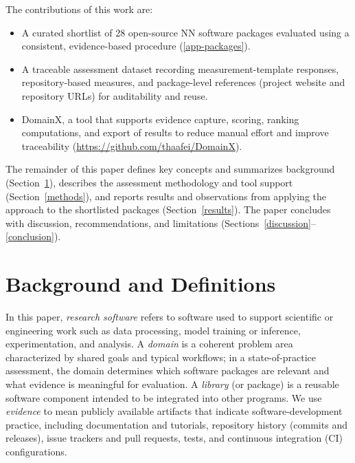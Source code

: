 \documentclass[final,1p,times,authoryear,12pt]{elsarticle}
\providecommand{\wss}[1]{\textcolor{blue}{\textit{#1}}}
\begin{document}
The contributions of this work are:
\begin{itemize}
  \item A curated shortlist of 28 open-source NN software packages evaluated using a consistent, evidence-based procedure (\ref{app-packages}).
  \item A traceable assessment dataset recording measurement-template responses, repository-based measures, and package-level references (project website and repository
        URLs) for auditability and reuse.
  \item DomainX, a tool that supports evidence capture, scoring, ranking computations, and export of results to reduce manual effort and improve traceability (\url{https://github.com/thaafei/DomainX}).
\end{itemize}

The remainder of this paper defines key concepts and summarizes background (Section~\ref{background}), describes the assessment methodology and tool support (Section~\ref{methods}),
and reports results and observations from applying the approach to the shortlisted packages (Section~\ref{results}).
 The paper concludes with discussion, recommendations, and limitations (Sections~\ref{discussion}--\ref{conclusion}).

\section{Background and Definitions} \label{background}


In this paper, \emph{research software} refers to software used to support scientific or engineering work such as data processing,
 model training or inference, experimentation, and analysis. A \emph{domain} is a coherent problem area characterized by
 shared goals and typical workflows; in a state-of-practice assessment, the domain determines which software packages are
 relevant and what evidence is meaningful for evaluation. A \emph{library} (or package) is a reusable software component intended
  to be integrated into other programs. We use \emph{evidence} to mean publicly available artifacts that indicate software-development
   practice, including documentation and tutorials, repository history (commits and releases), issue trackers and pull requests,
    tests, and continuous integration (CI) configurations.
\end{document}
